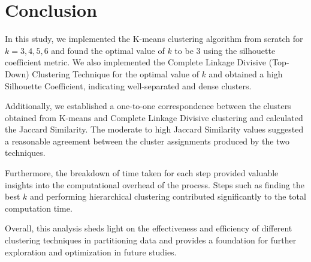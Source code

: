 \documentclass[12pt]{article}
\begin{document}
\section{Conclusion}

In this study, we implemented the K-means clustering algorithm from scratch for \( k = 3, 4, 5, 6 \) and found the optimal value of \( k \) to be 3 using the silhouette coefficient metric. We also implemented the Complete Linkage Divisive (Top-Down) Clustering Technique for the optimal value of \( k \) and obtained a high Silhouette Coefficient, indicating well-separated and dense clusters.

Additionally, we established a one-to-one correspondence between the clusters obtained from K-means and Complete Linkage Divisive clustering and calculated the Jaccard Similarity. The moderate to high Jaccard Similarity values suggested a reasonable agreement between the cluster assignments produced by the two techniques.

Furthermore, the breakdown of time taken for each step provided valuable insights into the computational overhead of the process. Steps such as finding the best \( k \) and performing hierarchical clustering contributed significantly to the total computation time.

Overall, this analysis sheds light on the effectiveness and efficiency of different clustering techniques in partitioning data and provides a foundation for further exploration and optimization in future studies.
\end{document}
